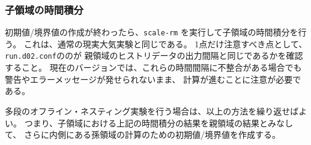 \subsubsection{子領域の時間積分}
初期値/境界値の作成が終わったら、\verb|scale-rm| を実行して子領域の時間積分を行う。
これは、通常の現実大気実験と同じである。
1点だけ注意すべき点として、
\verb|run.d02.conf|ののが
親領域のヒストリデータの出力間隔と同じであるかを確認すること。
現在のバージョンでは、これらの時間間隔に不整合がある場合でも警告やエラーメッセージが発せられないまま、
計算が進むことに注意が必要である。

多段のオフライン・ネスティング実験を行う場合は、以上の方法を繰り返せばよい。
つまり、子領域における上記の時間積分の結果を親領域の結果とみなして、
さらに内側にある孫領域の計算のための初期値/境界値を作成する。
